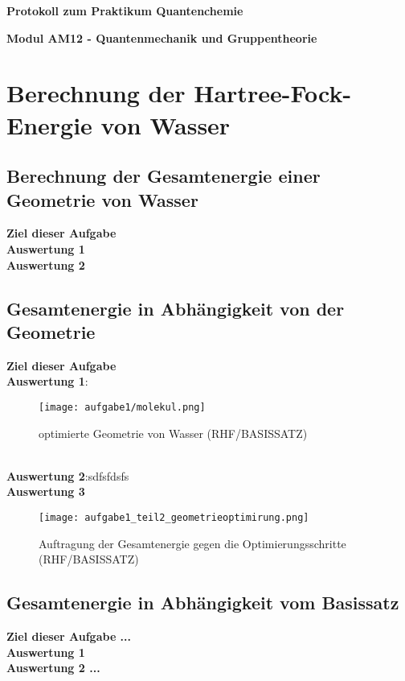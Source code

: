 \documentclass[12pt]{article}
\begin{document}
  \begin{titlepage}
  {\hfil \large \textbf{ Protokoll zum Praktikum Quantenchemie}\hfil}
\par
  \vspace{1cm}
\hfil \textbf{Modul AM12 - Quantenmechanik und Gruppentheorie}\hfil
\vspace{1cm}
  \end{titlepage}

\tableofcontents
\newpage
\section{Berechnung der Hartree-Fock-Energie von Wasser}
\subsection{Berechnung der Gesamtenergie einer Geometrie von Wasser}
\textbf{Ziel dieser Aufgabe}\\
\textbf{Auswertung 1}\\
\textbf{Auswertung 2}\\
\subsection{Gesamtenergie in Abhängigkeit von der Geometrie}
\textbf{Ziel dieser Aufgabe}\\
\textbf{Auswertung 1}:\\
\begin{figure}[!htbp]
\centering
  \texttt{[image: aufgabe1/molekul.png]}%
  \caption{optimierte Geometrie von Wasser (RHF/BASISSATZ)}
\end{figure}
\noindent
\\
\textbf{Auswertung 2}:sdfsfdsfs\\
\textbf{Auswertung 3}\\
\newpage
\begin{figure}[!htp]
\centering
  \texttt{[image: aufgabe1\_teil2\_geometrieoptimirung.png]}%
  \caption{Auftragung der Gesamtenergie gegen die Optimierungsschritte (RHF/BASISSATZ)}
\end{figure}
\subsection{Gesamtenergie in Abhängigkeit vom Basissatz}
\textbf{Ziel dieser Aufgabe ...}\\
\textbf{Auswertung 1 }\\
\textbf{Auswertung 2 ...}
\end{document}
